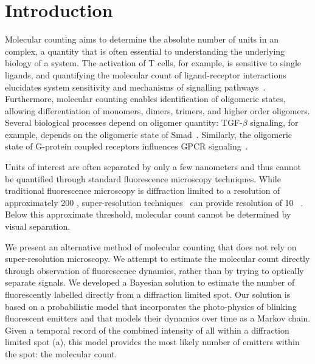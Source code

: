 \section{Introduction}



%
Molecular counting aims to determine the absolute number of units 
in an complex, a quantity that is often essential to understanding
the underlying biology of a system.
  The activation of T cells, for example, is sensitive to single ligands, and
  quantifying the molecular count of ligand-receptor interactions elucidates 
  system sensitivity and mechanisms of signalling pathways~\citep{irvine_2002}.
  Furthermore, molecular counting enables identification of oligomeric states, 
  allowing differentiation of monomers, dimers, trimers, and higher order oligomers.
  Several biological processes depend on oligomer quantity: TGF-$\beta$ signaling,
  for example, depends on the oligomeric state of Smad~\citep{inman_2002,
  moustakas_2002}.
  Similarly, the oligomeric state of G-protein coupled receptors influences 
  GPCR signaling~\citep{felce_2018, breitwieser_2004}.

%
Units of interest are often separated by only a few
nanometers and thus cannot be quantified through standard fluorescence
microscopy techniques.
  While traditional fluorescence microscopy is diffraction limited to a resolution 
  of approximately 200 \nanometer, super-resolution 
  techniques~\citep{betzig_2006,rust_2006,rittweger_sted_2009} 
  can provide resolution of 10 \nanometer~\citep{valli_seeing_2021}.
  Below this approximate threshold, molecular count cannot be determined
  by visual separation.

%
We present an alternative method of molecular counting 
that does not rely on super-resolution microscopy.
%
  We attempt to estimate the molecular count directly through observation of 
  fluorescence dynamics, rather than by trying to optically separate signals.
  We developed a Bayesian solution to estimate the number of
  fluorescently labelled \smallobjects directly from a diffraction limited
  spot.
  Our solution is based on a probabilistic model that incorporates the
  photo-physics of blinking fluorescent emitters and that models their dynamics over
  time as a Markov chain.
  Given a temporal record of the combined intensity of all \smallobjects within a
  diffraction limited spot (a), this model provides the 
  most likely number of emitters within the spot: the molecular count.

